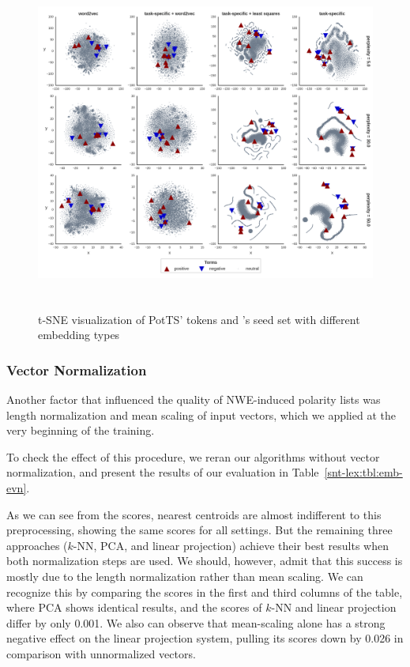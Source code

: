 \begin{figure}[bht]
  \centering
  \includegraphics[height=30em,width=\linewidth]{potts_embeddings.png}
  \caption[\citeauthor{Turney:03}'s seed
    set]{t-SNE visualization of PotTS' tokens and
    \citeauthor{Turney:03}'s seed set with different embedding
    types}\label{snt:fig:tsne-seeds}
\end{figure}

\subsubsection{Vector Normalization}\label{subsec:snt-lex:eowet}

Another factor that influenced the quality of NWE-induced polarity
lists was length normalization and mean scaling of input vectors,
which we applied at the very beginning of the training.

To check the effect of this procedure, we reran our algorithms without
vector normalization, and present the results of our evaluation in
Table~\ref{snt-lex:tbl:emb-evn}.

As we can see from the scores, nearest centroids are almost
indifferent to this preprocessing, showing the same scores for all
settings.  But the remaining three approaches ($k$-NN, PCA, and linear
projection) achieve their best results when both normalization steps
are used.  We should, however, admit that this success is mostly due
to the length normalization rather than mean scaling.  We can
recognize this by comparing the scores in the first and third columns
of the table, where PCA shows identical results, and the scores of
$k$-NN and linear projection differ by only 0.001.  We also can
observe that mean-scaling alone has a strong negative effect on the
linear projection system, pulling its scores down by 0.026 in
comparison with unnormalized vectors.

